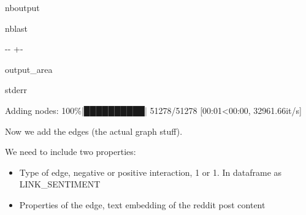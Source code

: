 \documentclass[letterpaper,10pt,english]{sphinxhowto}
\begin{document}
\begin{sphinxuseclass}{nboutput}
\begin{sphinxuseclass}{nblast}
{

\kern-\sphinxverbatimsmallskipamount\kern-\baselineskip
\kern+\FrameHeightAdjust\kern-\fboxrule
\vspace{\nbsphinxcodecellspacing}

\begin{sphinxuseclass}{output_area}
\begin{sphinxuseclass}{stderr}


\begin{sphinxVerbatim}[commandchars=\\\{\}]
Adding nodes: 100\%|██████████| 51278/51278 [00:01<00:00, 32961.66it/s]
\end{sphinxVerbatim}



\end{sphinxuseclass}
\end{sphinxuseclass}
}

\end{sphinxuseclass}
\end{sphinxuseclass}
\sphinxAtStartPar
Now we add the edges (the actual graph stuff).

\sphinxAtStartPar
We need to include two properties:
\begin{itemize}
\item {} 
\sphinxAtStartPar
Type of edge, negative or positive interaction, \sphinxhyphen{}1 or 1. In dataframe as LINK\_SENTIMENT

\item {} 
\sphinxAtStartPar
Properties of the edge, text embedding of the reddit post content

\end{itemize}
\end{document}
